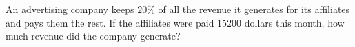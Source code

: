 An advertising company keeps $20\%$ of all the revenue it generates for its affiliates and pays them the rest. If the affiliates were paid $15200$ dollars this month, how much revenue did the company generate?

